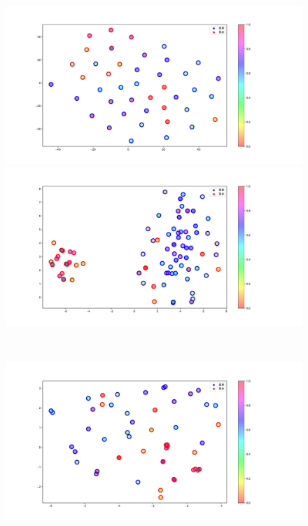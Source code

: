 \begin{figure}[h]
 \begin{minipage}[b]{0.48\linewidth}
  \centering
  \includegraphics[scale=0.15]{./imgs/tSNE/sofa_7.pdf}
 \end{minipage}
 \begin{minipage}[b]{0.48\linewidth}
  \centering
  \includegraphics[scale=0.15]{./imgs/tSNE/sofa_8.pdf}
 \end{minipage}\\
 \begin{minipage}[b]{0.48\linewidth}
  \centering
  \includegraphics[scale=0.15]{./imgs/tSNE/sofa_9.pdf}

\end{minipage}
\end{figure}
